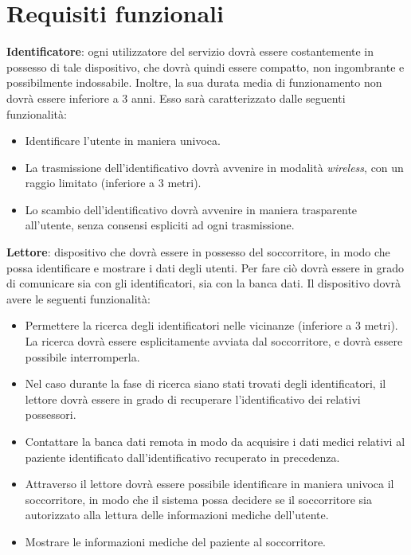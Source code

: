 \documentclass[a4paper,12pt]{report}
\begin{document}
\section{Requisiti funzionali}
\begin{description}
	\item \textbf{Identificatore}: ogni utilizzatore del servizio dovrà essere costantemente in possesso di tale dispositivo, che dovrà quindi essere compatto, non ingombrante e possibilmente indossabile. Inoltre, la sua durata media di funzionamento non dovrà essere inferiore a 3 anni. Esso sarà caratterizzato dalle seguenti funzionalità: 
	\begin{itemize}
		\item Identificare l'utente in maniera univoca.
		\item La trasmissione dell'identificativo dovrà avvenire in modalità \emph{wireless}, con un raggio limitato (inferiore a 3 metri).
		\item Lo scambio dell'identificativo dovrà avvenire in maniera trasparente all'utente, senza consensi espliciti ad ogni trasmissione.
	\end{itemize}

	\item \textbf{Lettore}: dispositivo che dovrà essere in possesso del soccorritore, in modo che possa identificare e mostrare i dati degli utenti. Per fare ciò dovrà essere in grado di comunicare sia con gli identificatori, sia con la banca dati. Il dispositivo dovrà avere le seguenti funzionalità:
	\begin{itemize}
		\item Permettere la ricerca degli identificatori nelle vicinanze (inferiore a 3 metri). La ricerca dovrà essere esplicitamente avviata dal soccorritore, e dovrà essere possibile interromperla.
		\item Nel caso durante la fase di ricerca siano stati trovati degli identificatori, il lettore dovrà essere in grado di recuperare l'identificativo dei relativi possessori.
		\item Contattare la banca dati remota in modo da acquisire i dati medici relativi al paziente identificato dall'identificativo recuperato in precedenza.
		\item Attraverso il lettore dovrà essere possibile identificare in maniera univoca il soccorritore, in modo che il sistema possa decidere se il soccorritore sia autorizzato alla lettura delle informazioni mediche dell'utente.
		\item Mostrare le informazioni mediche del paziente al soccorritore.
	\end{itemize}
\end{description}
\end{document}
